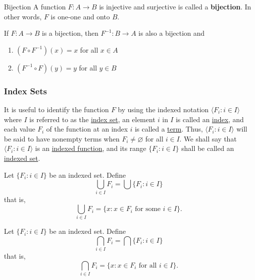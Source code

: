 \begin{definition}{Bijection}{}
    A function $F : A \to B$ is injective and surjective is called a
    \textbf{bijection}. In other words, $F$ is one-one and onto $B$.
\end{definition}

\begin{theorem}{}{}
    If $F : A \to B$ is a bijection, then $F^{-1} : B \to A$ is also a
    bijection and
    \begin{enumerate}

        \item $(F \circ F^{-1})(x) = x$ for all $x \in A$
        \item $(F^{-1} \circ F)(y) = y$ for all $y \in B$

    \end{enumerate}

\end{theorem}

\subsubsection{Index Sets}

It is useful to identify the function $F$ by using the indexed
notation $\langle F_i : i \in I \rangle$ where $I$ is referred to as
the \underline{index set}, an element $i$ in $I$ is called an
\underline{index}, and each value $F_i$ of the function at an index
$i$ is called a \underline{term}. Thus, $\langle F_i : i \in I
\rangle$ will be said to have nonempty terms when $F_i \neq
\varnothing$ for all $i \in I$. We shall say that $\langle F_i : i
\in I \rangle$ is an \underline{indexed function}, and its range $\{
F_i : i \in I \}$ shall be called an \underline{indexed set}.

\begin{definition}{}{}
    Let $\{ F_i : i \in I \}$ be an indexed set. Define
    \[
        \bigcup_{i \in I} F_i = \bigcup \{F_{i} : i \in I\}
    \]
    that is,
    \[
        \bigcup_{i \in I}F_{i} = \{ x : x \in F_i \text{ for some } i \in I \}.
    \]
\end{definition}

\begin{definition}{}{}
    Let $\{ F_i : i \in I \}$ be an indexed set. Define
    \[
        \bigcap_{i \in I} F_i = \bigcap \{F_{i} : i \in I\}
    \]
    that is,
    \[
        \bigcap_{i \in I}F_{i} = \{ x : x \in F_i \text{ for all } i \in I \}.
    \]
\end{definition}
